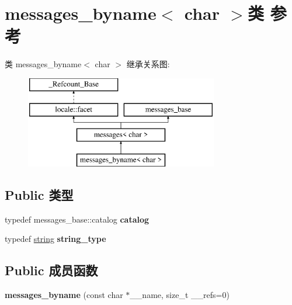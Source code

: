 \hypertarget{classmessages__byname_3_01char_01_4}{}\section{messages\+\_\+byname$<$ char $>$类 参考}
\label{classmessages__byname_3_01char_01_4}
类 messages\+\_\+byname$<$ char $>$ 继承关系图\+:\begin{figure}[H]
\begin{center}
\leavevmode
\includegraphics[height=4.000000cm]{classmessages__byname_3_01char_01_4}
\end{center}
\end{figure}
\subsection*{Public 类型}
\begin{DoxyCompactItemize}
\item 
\mbox{\label{classmessages__byname_3_01char_01_4_a1269f0d6d154dafaaa09a050318a2ed5}} 
typedef messages\+\_\+base\+::catalog {\bfseries catalog}
\item 
\mbox{\label{classmessages__byname_3_01char_01_4_a86a60eb78e726eabf1b888c21fcd15fc}} 
typedef \hyperlink{structstring}{string} {\bfseries string\+\_\+type}
\end{DoxyCompactItemize}
\subsection*{Public 成员函数}
\begin{DoxyCompactItemize}
\item 
\mbox{\label{classmessages__byname_3_01char_01_4_a310e61ec4cfdc05b70b1368b20e3f70c}} 
{\bfseries messages\+\_\+byname} (const char $\ast$\+\_\+\+\_\+name, size\+\_\+t \+\_\+\+\_\+refs=0)
\end{DoxyCompactItemize}
